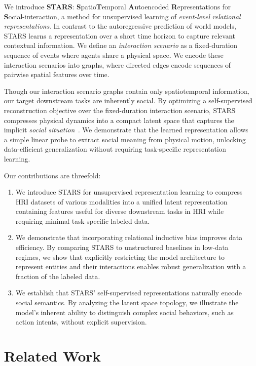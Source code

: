 \documentclass{article}
\newcommand{\method}{STARS\xspace}
\newcommand{\methodfull}{\textbf{S}patio\textbf{T}emporal \textbf{A}utoencoded \textbf{R}epresentations for \textbf{S}ocial-interaction\xspace}
\begin{document}
We introduce \textbf{\method}: \methodfull, a method for unsupervised learning of \emph{event-level relational representations}.
In contrast to the autoregressive prediction of world models, \method learns a representation over a short time horizon to capture relevant contextual information.
We define an \emph{interaction scenario} as a fixed-duration sequence of events where agents share a physical space.
We encode these interaction scenarios into graphs, where directed edges encode sequences of pairwise spatial features over time.

Though our interaction scenario graphs contain only spatiotemporal information, our target downstream tasks are inherently social.
By optimizing a self-supervised reconstruction objective over the fixed-duration interaction scenario, \method compresses physical dynamics into a compact latent space that captures the implicit \textit{social situation}~\cite{tsoi2022sean}.
We demonstrate that the learned representation allows a simple linear probe to extract social meaning from physical motion, unlocking data-efficient generalization without requiring task-specific representation learning.

Our contributions are threefold: 
\vspace{-0.5em}
\begin{enumerate}[nosep, leftmargin=*]
    \item We introduce \method for unsupervised representation learning to compress HRI datasets of various modalities into a unified latent representation containing features useful for diverse downstream tasks in HRI while requiring minimal task-specific labeled data.
    \item We demonstrate that incorporating relational inductive bias improves data efficiency. By comparing \method to unstructured baselines in low-data regimes, we show that explicitly restricting the model architecture to represent entities and their interactions enables robust generalization with a fraction of the labeled data.
    \item We establish that \method' self-supervised representations naturally encode social semantics. By analyzing the latent space topology, we illustrate the model's inherent ability to distinguish complex social behaviors, such as action intents, without explicit supervision.
\end{enumerate}


\section{Related Work}
\label{sec:relatedwork}
\end{document}
